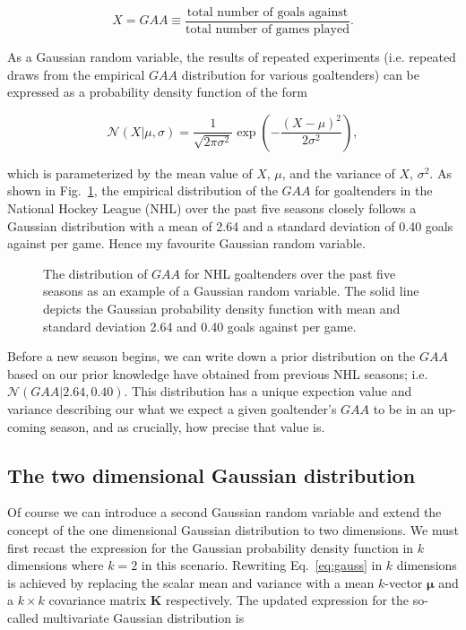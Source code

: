 \begin{equation}
  X = GAA \equiv \frac{\text{total number of goals against}}{\text{total number of games played}}.
\end{equation}

\noindent As a Gaussian random variable, the results of repeated experiments (i.e.
repeated draws from the empirical $GAA$ distribution for various goaltenders) can
be expressed as a probability density function of the form

\begin{equation}
  \mathcal{N}(X|\mu,\sigma) = \frac{1}{\sqrt{2\pi \sigma^2}} \exp{\left(
    -\frac{(X-\mu)^2}{2\sigma^2} \right)},
  \label{eq:gauss}
\end{equation}

\noindent which is parameterized by the mean value of $X$, $\mu$, and the variance
of $X$, $\sigma^2$. As shown in Fig.~\ref{fig:gaa1d}, the empirical distribution
of the $GAA$ for goaltenders in
the National Hockey League (NHL) over the past five seasons closely follows a
Gaussian distribution with a mean of 2.64 and a standard deviation of 0.40 goals
against per game. Hence my favourite Gaussian random variable. \\

\begin{figure}
  \centering
  \caption{The distribution of $GAA$ for NHL goaltenders over the past five
    seasons as an example of a Gaussian random variable. The solid line depicts
    the Gaussian probability density function with mean and standard
    deviation 2.64 and 0.40 goals against per game.}
  \label{fig:gaa1d}
\end{figure}

Before a new season begins, we can write down a prior distribution on the $GAA$
based on our prior knowledge have obtained from previous NHL seasons; i.e.
$\mathcal{N}(GAA|2.64,0.40)$. This distribution has a unique expection value and
variance describing our what we expect a given goaltender's $GAA$ to be in an
up-coming season, and as crucially, how precise that value is.

\subsection{The two dimensional Gaussian distribution}
Of course we can introduce a second Gaussian random variable and extend the 
concept of the one dimensional Gaussian distribution to two dimensions. We must
first recast the expression for the Gaussian probability density function in $k$
dimensions where $k=2$ in this scenario. Rewriting Eq.~\ref{eq:gauss} in $k$
dimensions is achieved by replacing the scalar mean and variance with a mean
$k$-vector $\boldsymbol{\mu}$ and a $k \times k$ covariance matrix $\mathbf{K}$
respectively. The updated expression for the so-called multivariate Gaussian
distribution is

